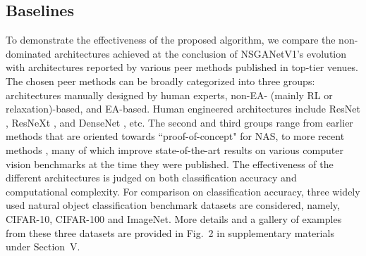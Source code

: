 \documentclass[journal]{IEEEtran}
\def\ourmethod{NSGANetV1}
\theoremstyle{definition}
\theoremstyle{remark}
\begin{document}
\subsection{Baselines}
To demonstrate the effectiveness of the proposed algorithm, we compare the non-dominated architectures achieved at the conclusion of \ourmethod{}'s evolution with architectures reported by various peer methods published in top-tier venues. The chosen peer methods can be broadly categorized into three groups: architectures manually designed by human experts, non-EA- (mainly RL or relaxation)-based, and EA-based. Human engineered architectures include ResNet \cite{resnet}, ResNeXt \cite{xie2017aggregated}, and DenseNet \cite{densenet}, etc. The second and third groups range from earlier methods \cite{zoph2016,real2017largescale,genetic-cnn} that are oriented towards ``proof-of-concept" for NAS, to more recent methods \cite{nasnet2018,real2019regularized,liu2018darts,cai2018proxylessnas}, many of which improve state-of-the-art results on various computer vision benchmarks at the time they were published. The effectiveness of the different architectures is judged on both classification accuracy and computational complexity. For comparison on classification accuracy, three widely used natural object classification benchmark datasets are considered, namely, CIFAR-10, CIFAR-100 and ImageNet. More details and a gallery of examples from these three datasets are provided in Fig.~2 in supplementary materials under Section~V.
\begin{comment}
CIFAR-10 and -100 are similar, as each of them consists of 50,000 images for training and 10,000 images for testing, with each image being 32 x 32 pixels. CIFAR-100 extends CIFAR-10 by adding 90 more classes resulting in 10 fewer training examples per class. ImageNet is a large-scale database containing more than 1.4 million images from 1,000 different classes and each image is of a much bigger size. ImageNet is significantly more challenging than the CIFAR datasets, and the cumulative progress is often cited as one of the main breakthroughs in computer vision and machine learning \cite{malik2017technical}. A gallery of examples from these three datasets is provided in Fig.~2 in supplementary materials under Section~V.
\end{comment}


\vspace{-2mm}
\end{document}
